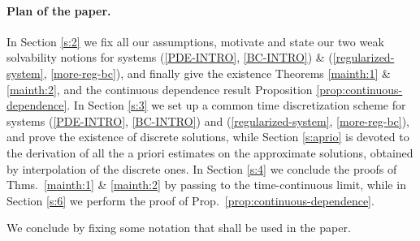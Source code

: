 \documentclass[a4paper,10pt,reqno]{amsart}
\numberwithin{equation}{section}
\numberwithin{equation}{section}
\begin{document}
\paragraph{\bf Plan of the paper.}
In Section \ref{s:2} we fix all our assumptions, motivate and state our two weak solvability notions for systems  (\ref{PDE-INTRO}, \ref{BC-INTRO}) \& (\ref{regularized-system}, \ref{more-reg-bc}),  and finally give the existence  Theorems  \ref{mainth:1} \& \ref{mainth:2}, and the continuous dependence result Proposition  \ref{prop:continuous-dependence}.
In Section \ref{s:3} we set up a  common  time discretization scheme for  systems (\ref{PDE-INTRO}, \ref{BC-INTRO}) and (\ref{regularized-system}, \ref{more-reg-bc}), 
and prove the existence of discrete solutions, while Section \ref{s:aprio} is devoted to the derivation of all the
a priori estimates on the approximate solutions, obtained by interpolation of the discrete ones. In Section \ref{s:4} we conclude the proofs of Thms.\  \ref{mainth:1} \& \ref{mainth:2} by passing to the time-continuous limit, while in Section \ref{s:6} we perform the proof of Prop.\  \ref{prop:continuous-dependence}.
\par
We conclude by fixing some notation that shall be used in the paper. 
\end{document}
